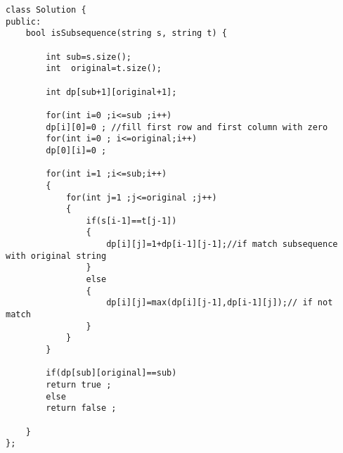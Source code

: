 \documentclass{article}
\begin{document}
\begin{lstlisting}[style=cppStyle]
class Solution {
public:
    bool isSubsequence(string s, string t) {

        int sub=s.size();
        int  original=t.size();
        
        int dp[sub+1][original+1];

        for(int i=0 ;i<=sub ;i++)
        dp[i][0]=0 ; //fill first row and first column with zero
        for(int i=0 ; i<=original;i++)
        dp[0][i]=0 ;

        for(int i=1 ;i<=sub;i++)
        {
            for(int j=1 ;j<=original ;j++)
            {
                if(s[i-1]==t[j-1])
                {
                    dp[i][j]=1+dp[i-1][j-1];//if match subsequence with original string 
                }
                else
                {
                    dp[i][j]=max(dp[i][j-1],dp[i-1][j]);// if not match 
                }
            }
        }

        if(dp[sub][original]==sub)
        return true ;
        else
        return false ;
        
    }
};
\end{lstlisting}





% 
% 
\end{document}
